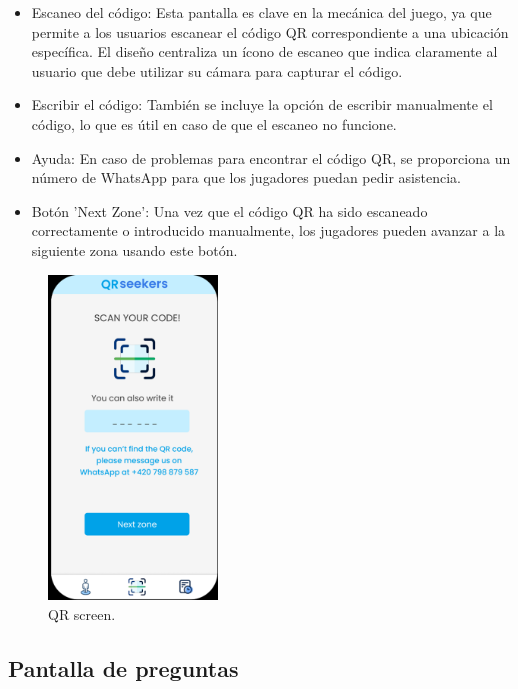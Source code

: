 \documentclass[letterpaper, 12pt]{report}
\begin{document}
\begin{itemize}
    \item Escaneo del código: Esta pantalla es clave en la mecánica del juego, ya que permite a los usuarios escanear el código QR correspondiente a una ubicación específica. El diseño centraliza un ícono de escaneo que indica claramente al usuario que debe utilizar su cámara para capturar el código.
    \item Escribir el código: También se incluye la opción de escribir manualmente el código, lo que es útil en caso de que el escaneo no funcione.
    \item Ayuda: En caso de problemas para encontrar el código QR, se proporciona un número de WhatsApp para que los jugadores puedan pedir asistencia.
    \item Botón 'Next Zone': Una vez que el código QR ha sido escaneado correctamente o introducido manualmente, los jugadores pueden avanzar a la siguiente zona usando este botón.
\end{itemize}

\begin{figure}[H]
\centering
\includegraphics[width=0.4\textwidth]{figure9.png}
\caption{QR screen.}
\label{fig:1}
\end{figure}

\subsection{Pantalla de preguntas}
\end{document}
